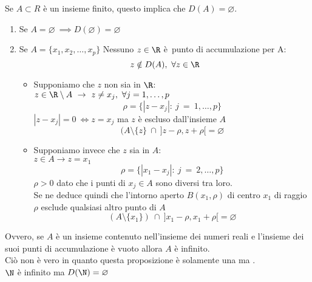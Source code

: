 \documentclass[../appunti.tex]{subfiles}
\begin{document}
\begin{dimo}
Se $A \subset R$ è un insieme finito, questo implica che $D(A) = \varnothing$.\\

\begin{enumerate}

\item 
Se $A = \varnothing\ \implies D(\varnothing) = \varnothing$

\item 
Se $A = \{ x_1, x_2, \dots, x_p \}$ Nessuno $ z \in \R$ 
è punto di accumulazione per A:
\begin{equation}
	z \notin D(A),\ \forall z \in \R
\end{equation}	

	\begin{itemize}
	\item 
	
	Supponiamo che $z$ non sia in $\R$: \\
	$ z \in \R \setminus A\ \to\ z \neq x_j,\ \forall j = 1, \dots, p$
	\begin{equation}
	\rho = \{ | z - x_j |:\ j\ =\ 1, \dots, p \}
	\end{equation}
	$ | z - x_j | = 0 \ \iff z = x_j $ ma $z$ è escluso dall'insieme $A$
	\begin{equation} 
		(A \setminus \{ z \}\ \cap\ ] z - \rho, z + \rho [ = \varnothing
	\end{equation}

	\item

	Supponiamo invece che $z$ sia in $A$:\\
	$ z \in A \to z = x_1$
	\begin{equation}
	\rho = \{  | x_1 - x_j | :\ j\ =\ 2, \dots, p \}
	\end{equation}
	$\rho > 0 $ dato che i punti di $x_j \in A$ sono diversi tra loro.\\
	Se ne deduce quindi che l'intorno aperto $B(x_1, \rho)$ di centro
	$x_1$ di raggio $\rho$ esclude qualsiasi altro punto di $A$
	\begin{equation}
	( A \setminus \{ x_1 \} )\ \cap\ ] x_1 - \rho, x_1 + \rho [ = \varnothing
	\end{equation}

	\end{itemize}
\end{enumerate}
\end{dimo}

\begin{esem}
Ovvero, se $A$ è un insieme contenuto nell'insieme dei numeri reali e 
l'insieme dei suoi punti di accumulazione  è vuoto allora $A$ 
è infinito.\\
Ciò non è vero in quanto questa proposizione è solamente una 
 ma . \\
$\N$ è infinito ma $D(\N) = \varnothing$
\end{esem}
\end{document}
